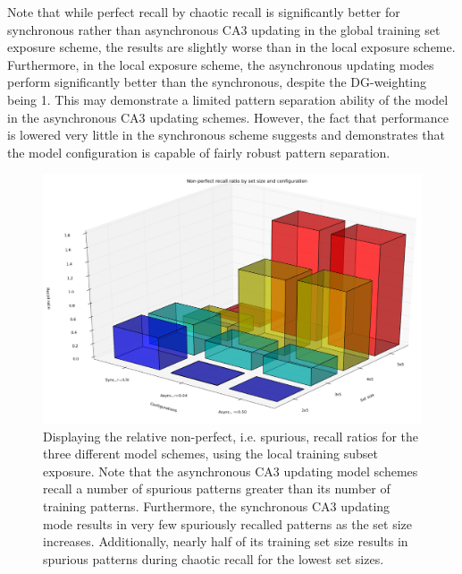 Note that while perfect recall by chaotic recall is significantly better for synchronous rather than asynchronous CA3 updating in the global training set exposure scheme, the results are slightly worse than in the local exposure scheme. Furthermore, in the local exposure scheme, the asynchronous updating modes perform significantly better than the synchronous, despite the DG-weighting being 1. This may demonstrate a limited pattern separation ability of the model in the asynchronous CA3 updating schemes. However, the fact that performance is lowered very little in the synchronous scheme suggests and demonstrates that the model configuration is capable of fairly robust pattern separation.

\begin{figure}
    \centering
    \includegraphics[width=13cm]{fig/3d_non_perfect_recall_by_set_size_and_configs_hpc_local_cut}
    \caption{Displaying the relative non-perfect, i.e. spurious, recall ratios for the three different model schemes, using the local training subset exposure. Note that the asynchronous CA3 updating model schemes recall a number of spurious patterns greater than its number of training patterns. Furthermore, the synchronous CA3 updating mode results in very few spuriously recalled patterns as the set size increases. Additionally, nearly half of its training set size results in spurious patterns during chaotic recall for the lowest set sizes.}
    \label{fig:3d_non_perfect_recall_by_set_size_and_configs_hpc_local_cut}
\end{figure}

